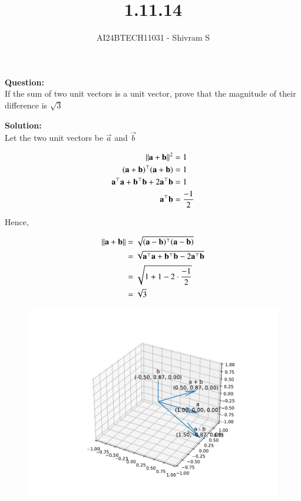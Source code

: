 \documentclass[journal]{IEEEtran}
\begin{document}

\vspace{3cm}

\title{1.11.14}
\author{AI24BTECH11031 - Shivram S
}
{\let\newpage\relax\maketitle}

\renewcommand{\thefigure}{\theenumi}
\renewcommand{\thetable}{\theenumi}
\setlength{\intextsep}{10pt} %


\renewcommand{\thetable}{\theenumi}


\textbf{Question: }\\
If the sum of two unit vectors is a unit vector, prove that the magnitude of their difference
is $\sqrt 3$

\textbf{Solution: } \\
Let the two unit vectors be $\vec{a}$ and $\vec{b}$

\begin{align}
    \left\lVert\mathbf{a} + \mathbf{b}\right\rVert^2 &= 1 \\
    (\mathbf{a}+\mathbf{b})^\top(\mathbf{a}+\mathbf{b}) &= 1 \\
    \mathbf{a}^\top\mathbf{a} + \mathbf{b}^\top\mathbf{b} + 2\mathbf{a}^\top\mathbf{b} &= 1 \\
    \mathbf{a}^\top\mathbf{b} &= \frac{-1}{2}
\end{align}

Hence,

\begin{align}
    \left\lVert\mathbf{a} + \mathbf{b}\right\rVert &= \sqrt{(\mathbf{a}-\mathbf{b})^\top(\mathbf{a}-\mathbf{b})} \\
    &= \sqrt{\mathbf{a}^\top\mathbf{a} + \mathbf{b}^\top\mathbf{b} - 2\mathbf{a}^\top\mathbf{b}} \\
    &= \sqrt{1 + 1 - 2 \cdot \frac{-1}{2}} \\
    &= \sqrt{3}
\end{align}

\begin{figure}[h!]
    \centering
    \includegraphics[width=0.7\linewidth]{figs/fig.pdf}
\end{figure}
\end{document}
